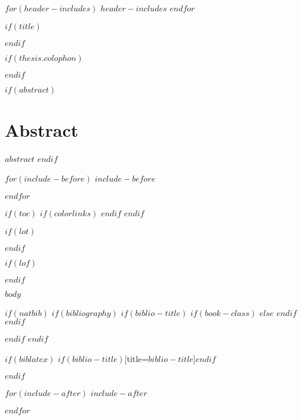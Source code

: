 $for(header-includes)$
  $header-includes$
$endfor$




$if(title)$
\prefrontmatter

\cleartoevenpage

$endif$

$if(thesis.colophon)$

\cleartooddpage
$endif$

$if(abstract)$
\chapter{Abstract}
$abstract$
\clearforchapter
$endif$

$for(include-before)$
$include-before$

$endfor$

$if(toc)$
{
$if(colorlinks)$
  \hypersetup{linkcolor=$if(toccolor)$$toccolor$$else$black$endif$}
$endif$
\setcounter{tocdepth}{$toc-depth$}
\tableofcontents
}
$endif$

$if(lot)$
\listoftables
$endif$

$if(lof)$
\listoffigures
$endif$

\mainmatter
$body$

$if(natbib)$
$if(bibliography)$
$if(biblio-title)$
$if(book-class)$
\renewcommand\bibname{$biblio-title$}
$else$
\renewcommand\refname{$biblio-title$}
$endif$
$endif$


$endif$
$endif$

$if(biblatex)$
\printbibliography$if(biblio-title)$[title=$biblio-title$]$endif$

$endif$

$for(include-after)$
$include-after$

$endfor$


